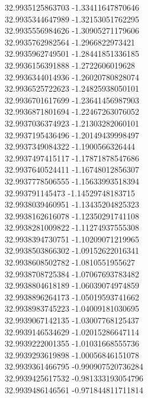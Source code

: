 {32.9935125863703	-1.33411647870646\\
32.9935344647989	-1.32153051762295\\
32.9935556984626	-1.30905271179606\\
32.9935762982564	-1.2966822973421\\
32.9935962749501	-1.28441851336185\\
32.9936156391888	-1.2722606019628\\
32.9936344014936	-1.26020780828074\\
32.9936525722623	-1.24825938050101\\
32.9936701617699	-1.23641456987903\\
32.9936871801694	-1.22467263076052\\
32.9937036374923	-1.21303282060101\\
32.9937195436496	-1.20149439998497\\
32.9937349084322	-1.1900566326444\\
32.9937497415117	-1.17871878547686\\
32.9937640524411	-1.16748012856307\\
32.9937778506555	-1.15633993518394\\
32.993791145473	-1.14529748183715\\
32.9938039460951	-1.13435204825323\\
32.9938162616078	-1.12350291741108\\
32.9938281009822	-1.11274937555308\\
32.9938394730751	-1.10209071219965\\
32.9938503866302	-1.09152622016341\\
32.9938608502782	-1.0810551955627\\
32.9938708725384	-1.07067693783482\\
32.9938804618189	-1.06039074974859\\
32.9938896264173	-1.05019593741662\\
32.9938983745223	-1.04009181030695\\
32.9939067142135	-1.03007768125437\\
32.9939146534629	-1.02015286647114\\
32.9939222001355	-1.01031668555736\\
32.9939293619898	-1.00056846151078\\
32.9939361466795	-0.990907520736284\\
32.9939425617532	-0.981333193054796\\
32.9939486146561	-0.971844811711814\\
}
